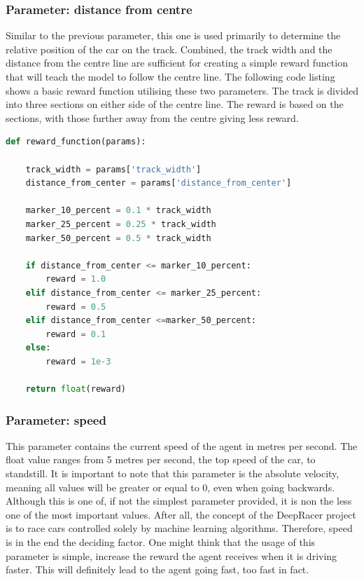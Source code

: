 \subsubsection{Parameter: distance from centre}
Similar to the previous parameter, this one is used primarily to determine the relative position of the car on the track. Combined, the track width and the distance from the centre line are sufficient for creating a simple reward function that will teach the model to follow the centre line. The following code listing shows a basic reward function utilising these two parameters. The track is divided into three sections on either side of the centre line. The reward is based on the sections, with those further away from the centre giving less reward.

\begin{minipage}{\linewidth}
\begin{lstlisting}[language={Python},label={lst:reward_distance}, caption={Reward function using track width and distance from centre}]
def reward_function(params):

    track_width = params['track_width']
    distance_from_center = params['distance_from_center']

    marker_10_percent = 0.1 * track_width
    marker_25_percent = 0.25 * track_width
    marker_50_percent = 0.5 * track_width

    if distance_from_center <= marker_10_percent:
        reward = 1.0
    elif distance_from_center <= marker_25_percent:
        reward = 0.5
    elif distance_from_center <=marker_50_percent:
        reward = 0.1
    else:
        reward = 1e-3

    return float(reward)
\end{lstlisting}
\end{minipage}

\subsubsection{Parameter: speed}
This parameter contains the current speed of the agent in metres per second. The float value ranges from 5 metres per second, the top speed of the car, to standstill. It is important to note that this parameter is the absolute velocity, meaning all values will be greater or equal to 0, even when going backwards. Although this is one of, if not the simplest parameter provided, it is non the less one of the most important values. After all, the concept of the DeepRacer project is to race cars controlled solely by machine learning algorithms. Therefore, speed is in the end the deciding factor. One might think that the usage of this parameter is simple, increase the reward the agent receives when it is driving faster. This will definitely lead to the agent going fast, too fast in fact. 

